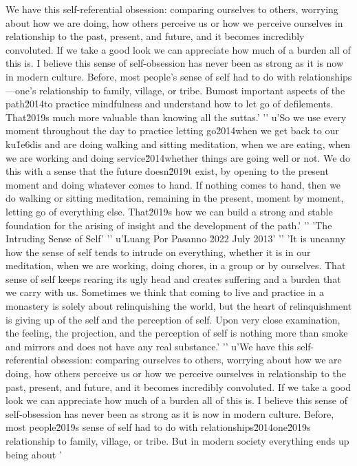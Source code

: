 We have this self-referential obsession: comparing ourselves to others, 
worrying about how we are doing, how others perceive us or how we 
perceive ourselves in relationship to the past, present, and future, 
and it becomes incredibly convoluted. If we take a good look we can 
appreciate how much of a burden all of this is. I believe this sense of 
self-obsession has never been as strong as it is now in modern culture. 
Before, most people's sense of self had to do with 
relationships---one's relationship to family, village, or tribe. Bumost important aspects of the path\u2014to practice mindfulness and understand how to let go of defilements. That\u2019s much more valuable than knowing all the suttas.'
'\n'
u'So we use every moment throughout the day to practice letting go\u2014when we get back to our ku\u1e6dis and are doing walking and sitting meditation, when we are eating, when we are working and doing service\u2014whether things are going well or not. We do this with a sense that the future doesn\u2019t exist, by opening to the present moment and doing whatever comes to hand. If nothing comes to hand, then we do walking or sitting meditation, remaining in the present, moment by moment, letting go of everything else. That\u2019s how we can build a strong and stable foundation for the arising of insight and the development of the path.'
'\n'
'The Intruding Sense of Self'
'\n'
u'Luang Por Pasanno \u2022 July 2013'
'\n'
'It is uncanny how the sense of self tends to intrude on everything, whether it is in our meditation, when we are working, doing chores, in a group or by ourselves. That sense of self keeps rearing its ugly head and creates suffering and a burden that we carry with us. Sometimes we think that coming to live and practice in a monastery is solely about relinquishing the world, but the heart of relinquishment is giving up of the self and the perception of self. Upon very close examination, the feeling, the projection, and the perception of self is nothing more than smoke and mirrors and does not have any real substance.'
'\n'
u'We have this self-referential obsession: comparing ourselves to others, worrying about how we are doing, how others perceive us or how we perceive ourselves in relationship to the past, present, and future, and it becomes incredibly convoluted. If we take a good look we can appreciate how much of a burden all of this is. I believe this sense of self-obsession has never been as strong as it is now in modern culture. Before, most people\u2019s sense of self had to do with relationships\u2014one\u2019s relationship to family, village, or tribe. But in modern society everything ends up being about '
